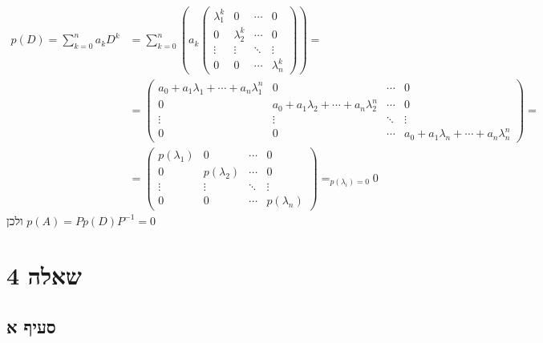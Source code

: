 \documentclass{article}
\DeclareMathOperator*{\equals}{=}
\begin{document}
\begin{align*}
    p(D)=\sum_{k=0}^n  a_k D^k & =\sum_{k=0}^n\left( a_k \begin{pmatrix}
            \lambda_1^k & 0           & \cdots & 0           \\
            0           & \lambda_2^k & \cdots & 0           \\
            \vdots      & \vdots      & \ddots & \vdots      \\
            0           & 0           & \cdots & \lambda_n^k
        \end{pmatrix} \right)= \\
                               & =\begin{pmatrix}
        a_0+a_1\lambda_1+\cdots+a_n\lambda_1^n & 0                                      & \cdots & 0                                      \\
        0                                      & a_0+a_1\lambda_2+\cdots+a_n\lambda_2^n & \cdots & 0                                      \\
        \vdots                                 & \vdots                                 & \ddots & \vdots                                 \\
        0                                      & 0                                      & \cdots & a_0+a_1\lambda_n+\cdots+a_n\lambda_n^n
    \end{pmatrix}=                                \\
                               & = \begin{pmatrix}
        p(\lambda_1) & 0            & \cdots & 0            \\
        0            & p(\lambda_2) & \cdots & 0            \\
        \vdots       & \vdots       & \ddots & \vdots       \\
        0            & 0            & \cdots & p(\lambda_n)
    \end{pmatrix}\equals_{p(\lambda_i)=0}
    0
\end{align*}
ולכן $p(A)=Pp(D)P^{-1}=0$

\pagebreak

\section*{שאלה 4}

\subsection*{סעיף א}
\end{document}
